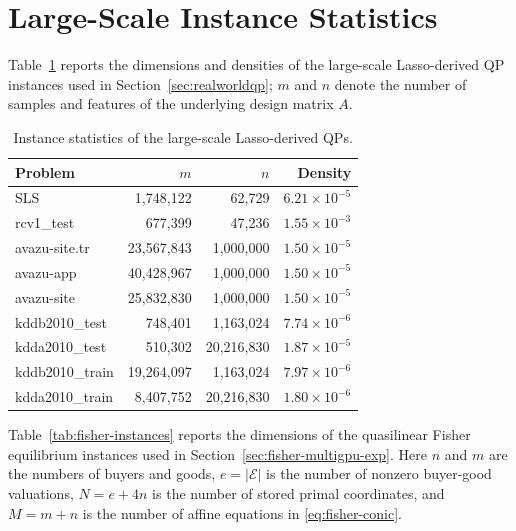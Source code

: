 \documentclass[letterpaper]{article} %
\theoremstyle{definition}
\theoremstyle{remark}
\newcommand{\papertablesetup}{\small\setstretch{1.0}\renewcommand{\arraystretch}{1.2}}
\begin{document}
\section{Large-Scale Instance Statistics}
\label{app:instance-statistics}

Table~\ref{tab:lasso-instances} reports the dimensions and densities of
the large-scale Lasso-derived QP instances used in
Section~\ref{sec:realworldqp}; $m$ and $n$ denote the number of samples
and features of the underlying design matrix $A$.

\begin{table}[H]
  \centering
  \papertablesetup
  \caption{Instance statistics of the large-scale Lasso-derived QPs.}
  \label{tab:lasso-instances}
  \medskip
\begin{tabular}{lrrr}
    \toprule
    Problem & $m$ & $n$ & Density \\
    \midrule
    SLS & 1,748,122 & 62,729 & $6.21\times10^{-5}$ \\
    rcv1\_test & 677,399 & 47,236 & $1.55\times10^{-3}$ \\
    avazu-site.tr & 23,567,843 & 1,000,000 & $1.50\times10^{-5}$ \\
    avazu-app & 40,428,967 & 1,000,000 & $1.50\times10^{-5}$ \\
    avazu-site & 25,832,830 & 1,000,000 & $1.50\times10^{-5}$ \\
    kddb2010\_test & 748,401 & 1,163,024 & $7.74\times10^{-6}$ \\
    kdda2010\_test & 510,302 & 20,216,830 & $1.87\times10^{-5}$ \\
    kddb2010\_train & 19,264,097 & 1,163,024 & $7.97\times10^{-6}$ \\
    kdda2010\_train & 8,407,752 & 20,216,830 & $1.80\times10^{-6}$ \\
    \bottomrule
  \end{tabular}
\end{table}

Table~\ref{tab:fisher-instances} reports the dimensions of the quasilinear
Fisher equilibrium instances used in
Section~\ref{sec:fisher-multigpu-exp}. Here $n$ and $m$ are the numbers of
buyers and goods, $e=|\mathcal E|$ is the number of nonzero buyer-good
valuations, $N=e+4n$ is the number of stored primal coordinates, and
$M=m+n$ is the number of affine equations in \eqref{eq:fisher-conic}.
\end{document}

